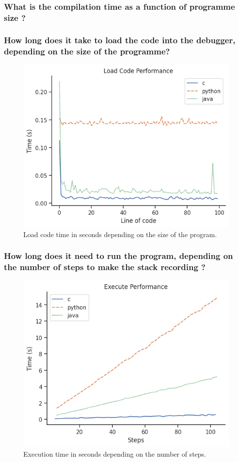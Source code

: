 \documentclass[english,submission]{programming}
\begin{document}
\subsubsection{What is the compilation time as a function of programme size ?}
\subsubsection{How long does it take to load the code into the debugger, depending on the size of the programme?}

\begin{figure}[h]
  \centering
  \includegraphics[width=0.8\linewidth]{img/load_code.png}
  \caption{Load code time in seconds depending on the size of the program.}
  \label{fig:load-code}
\end{figure}

\subsubsection{How long does it need to run the program, depending on the number of steps to make the stack recording ?}

\begin{figure}[h]
  \centering
  \includegraphics[width=0.8\linewidth]{img/execute.png}
  \caption{Execution time in seconds depending on the number of steps.}
  \label{fig:execute}
\end{figure}
\end{document}
